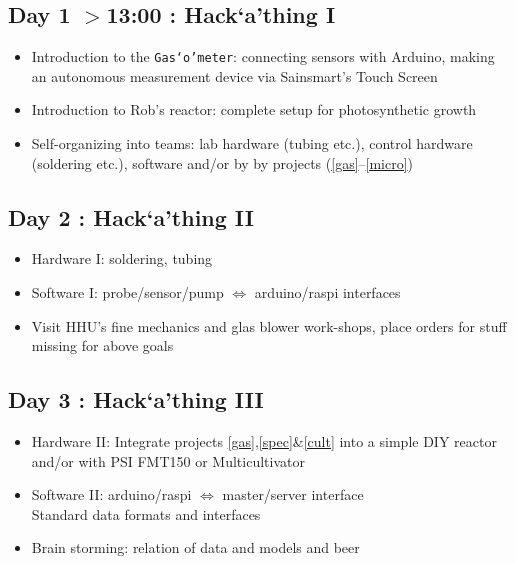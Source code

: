 \documentclass[12pt,a4paper]{scrartcl}
\newcommand{\hack}[0]{Hack`a'thing}
\newcommand{\gasometer}[0]{\texttt{Gas`o'meter}}
\begin{document}
\subsection{Day 1 $>$13:00 : \hack{} I}

\begin{itemize}
\item Introduction to the \gasometer{}: connecting sensors with Arduino,
  making an autonomous measurement device via Sainsmart's Touch Screen
\item Introduction to Rob's reactor: complete setup for photosynthetic growth
\item Self-organizing into teams: lab hardware (tubing etc.), control hardware
(soldering etc.), software and/or by by projects (\ref{gas}--\ref{micro}) 
\end{itemize}

\subsection{Day 2 : \hack{} II}


\begin{itemize}
\item Hardware I: soldering, tubing
\item Software I: probe/sensor/pump $\Leftrightarrow$ arduino/raspi interfaces
\item Visit HHU's fine mechanics and glas blower work-shops, place
  orders for stuff missing for above goals
\end{itemize}

\subsection{Day 3 : \hack{} III}

\begin{itemize}
\item Hardware II: Integrate projects \ref{gas},\ref{spec}\&\ref{cult}
  into a simple DIY reactor and/or with PSI FMT150 or Multicultivator
\item Software II: arduino/raspi $\Leftrightarrow$  master/server interface\\
  Standard data formats and interfaces
\item Brain storming: relation of data and models and beer
\end{itemize}
\end{document}
